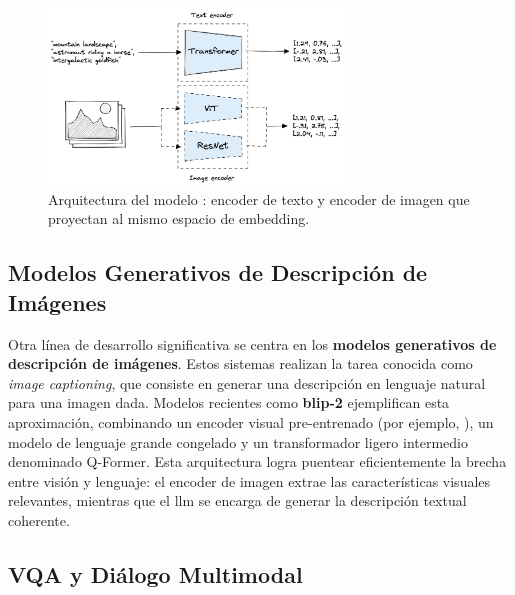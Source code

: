 \begin{figure}[h]
  \centering
  \includegraphics[width=0.7\textwidth]{archivos/clip_architecture.png}
  \caption[Arquitectura de CLIP]{Arquitectura del modelo : encoder de texto y encoder de imagen que proyectan al mismo espacio de embedding.}
  \label{fig:clip_architecture}
\end{figure}

\subsection{Modelos Generativos de Descripción de Imágenes}

Otra línea de desarrollo significativa se centra en los \textbf{modelos generativos de descripción de imágenes}. Estos sistemas realizan la tarea conocida como \emph{image captioning}, que consiste en generar una descripción en lenguaje natural para una imagen dada. Modelos recientes como \textbf{\gls{blip}-2} ejemplifican esta aproximación, combinando un encoder visual pre-entrenado (por ejemplo,  ), un modelo de lenguaje grande congelado y un transformador ligero intermedio denominado Q-Former. Esta arquitectura logra puentear eficientemente la brecha entre visión y lenguaje: el encoder de imagen extrae las características visuales relevantes, mientras que el \gls{llm} se encarga de generar la descripción textual coherente.

\subsection{VQA y Diálogo Multimodal}

